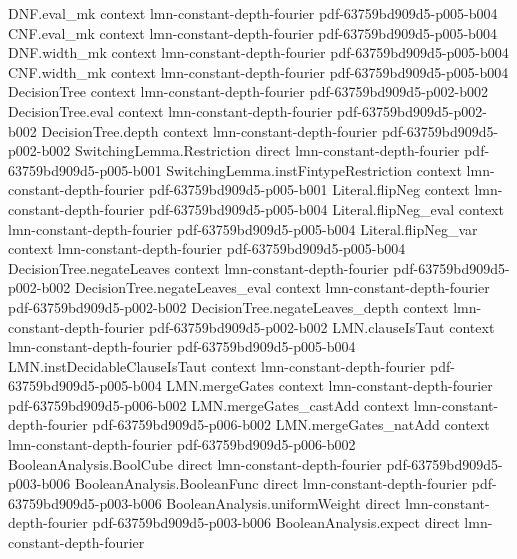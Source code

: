 \begin{lemma}
\proofstep
  {DNF.eval_mk}
  {context}
  {lmn-constant-depth-fourier}
  {pdf-63759bd909d5-p005-b004}
\proofstep
  {CNF.eval_mk}
  {context}
  {lmn-constant-depth-fourier}
  {pdf-63759bd909d5-p005-b004}
\proofstep
  {DNF.width_mk}
  {context}
  {lmn-constant-depth-fourier}
  {pdf-63759bd909d5-p005-b004}
\proofstep
  {CNF.width_mk}
  {context}
  {lmn-constant-depth-fourier}
  {pdf-63759bd909d5-p005-b004}
\proofstep
  {DecisionTree}
  {context}
  {lmn-constant-depth-fourier}
  {pdf-63759bd909d5-p002-b002}
\proofstep
  {DecisionTree.eval}
  {context}
  {lmn-constant-depth-fourier}
  {pdf-63759bd909d5-p002-b002}
\proofstep
  {DecisionTree.depth}
  {context}
  {lmn-constant-depth-fourier}
  {pdf-63759bd909d5-p002-b002}
\proofstep
  {SwitchingLemma.Restriction}
  {direct}
  {lmn-constant-depth-fourier}
  {pdf-63759bd909d5-p005-b001}
\proofstep
  {SwitchingLemma.instFintypeRestriction}
  {context}
  {lmn-constant-depth-fourier}
  {pdf-63759bd909d5-p005-b001}
\proofstep
  {Literal.flipNeg}
  {context}
  {lmn-constant-depth-fourier}
  {pdf-63759bd909d5-p005-b004}
\proofstep
  {Literal.flipNeg_eval}
  {context}
  {lmn-constant-depth-fourier}
  {pdf-63759bd909d5-p005-b004}
\proofstep
  {Literal.flipNeg_var}
  {context}
  {lmn-constant-depth-fourier}
  {pdf-63759bd909d5-p005-b004}
\proofstep
  {DecisionTree.negateLeaves}
  {context}
  {lmn-constant-depth-fourier}
  {pdf-63759bd909d5-p002-b002}
\proofstep
  {DecisionTree.negateLeaves_eval}
  {context}
  {lmn-constant-depth-fourier}
  {pdf-63759bd909d5-p002-b002}
\proofstep
  {DecisionTree.negateLeaves_depth}
  {context}
  {lmn-constant-depth-fourier}
  {pdf-63759bd909d5-p002-b002}
\proofstep
  {LMN.clauseIsTaut}
  {context}
  {lmn-constant-depth-fourier}
  {pdf-63759bd909d5-p005-b004}
\proofstep
  {LMN.instDecidableClauseIsTaut}
  {context}
  {lmn-constant-depth-fourier}
  {pdf-63759bd909d5-p005-b004}
\proofstep
  {LMN.mergeGates}
  {context}
  {lmn-constant-depth-fourier}
  {pdf-63759bd909d5-p006-b002}
\proofstep
  {LMN.mergeGates_castAdd}
  {context}
  {lmn-constant-depth-fourier}
  {pdf-63759bd909d5-p006-b002}
\proofstep
  {LMN.mergeGates_natAdd}
  {context}
  {lmn-constant-depth-fourier}
  {pdf-63759bd909d5-p006-b002}
\proofstep
  {BooleanAnalysis.BoolCube}
  {direct}
  {lmn-constant-depth-fourier}
  {pdf-63759bd909d5-p003-b006}
\proofstep
  {BooleanAnalysis.BooleanFunc}
  {direct}
  {lmn-constant-depth-fourier}
  {pdf-63759bd909d5-p003-b006}
\proofstep
  {BooleanAnalysis.uniformWeight}
  {direct}
  {lmn-constant-depth-fourier}
  {pdf-63759bd909d5-p003-b006}
\proofstep
  {BooleanAnalysis.expect}
  {direct}
  {lmn-constant-depth-fourier}

\end{lemma}
